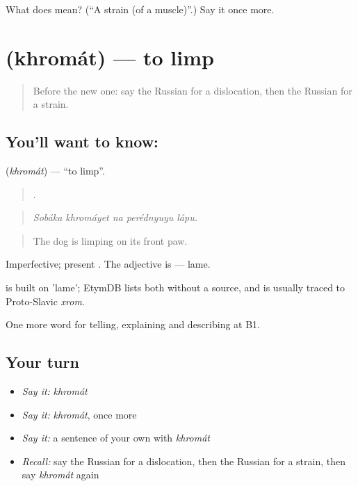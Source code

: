 \begin{tcolorbox}[breakable,colback=teal!4,colframe=teal!35!black,title={Before you move on}]
What does  mean? (\textquotedblleft{}A strain (of a muscle)\textquotedblright{}.) Say it once more.
\end{tcolorbox}
\section[\texorpdfstring{\ru{хромать} (khromát)}{хромать (khromát)}]{ (khromát) — to limp}

\label{lesson:RU-C484-khromat}



\begin{quote}
Before the new one: say the Russian for a dislocation, then the Russian for a strain.
\end{quote}

\subsection*{You'll want to know: }
\textbf{} (\emph{khromát}) — \textquotedblleft{}to limp\textquotedblright{}.

\begin{quote}
    .
\end{quote}

\begin{quote}
\emph{Sobáka khromáyet na perédnyuyu lápu.}
\end{quote}

\begin{quote}
The dog is limping on its front paw.
\end{quote}

Imperfective; present . The adjective is \emph{} — lame.

\begin{cousinweb}
\emph{} is built on \emph{} 'lame'; EtymDB lists both without a source, and \emph{} is usually traced to Proto-Slavic \emph{xrom}.
\end{cousinweb}

\begin{grammarlens}[title={What you've built}]
One more word for telling, explaining and describing at B1.
\end{grammarlens}

\subsection*{Your turn}
\begin{itemize}
\raggedright
  \item \emph{Say it:} \emph{khromát}
  \item \emph{Say it:} \emph{khromát}, once more
  \item \emph{Say it:} a sentence of your own with \emph{khromát}
  \item \emph{Recall:} say the Russian for a dislocation, then the Russian for a strain, then say \emph{khromát} again
\end{itemize}

